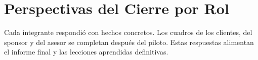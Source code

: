 \documentclass[11pt,a4paper]{article}
\begin{document}
\newcommand{\espacio}{\rule{0pt}{1.25cm}}
\newcommand{\perspectiva}[4]{%
\Needspace{18\baselineskip}
\subsection{#1}
{\small\noindent\textbf{Quién la completa:} #2 \quad \textbar\quad \textbf{Preguntas guía:} \textit{#3}}

\vspace{0.1cm}
{\small
\noindent\begin{tabularx}{\textwidth}{@{}P{3.6cm} |L@{}}
\toprule
\rowcolor{AzulClaro}
\textbf{Aspecto} & \textbf{Respuesta} \\
\midrule
Lo que salió bien & \espacio \\ \hline
Lo que salió mal & \espacio \\ \hline
Qué haría distinto & \espacio \\ \hline
#4 & \espacio \\
\bottomrule
\end{tabularx}
}
\vspace{0.15cm}}

\newcommand{\perspectivallena}[6]{%
\Needspace{16\baselineskip}
\subsection{#1}
{\small\noindent\textbf{Responde:} #2}

\vspace{0.1cm}
{\small
\rowcolors{2}{white}{GrisFila}
\noindent\begin{tabularx}{\textwidth}{@{}P{3.0cm} L@{}}
\toprule
\rowcolor{AzulClaro}
\textbf{Aspecto} & \textbf{Respuesta} \\
\midrule
Lo que salió bien & #3 \\
Lo que salió mal & #4 \\
Qué haría distinto & #5 \\
Mirando adelante & #6 \\
\bottomrule
\end{tabularx}
}
\vspace{0.15cm}}
\section{Perspectivas del Cierre por Rol}
Cada integrante respondió con hechos concretos. Los cuadros de los clientes, del sponsor y del asesor se completan después del piloto. Estas respuestas alimentan el informe final y las lecciones aprendidas definitivas.
\end{document}
